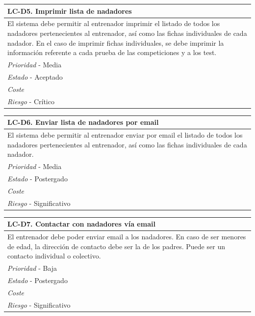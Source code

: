 	\begin{center}
		\begin{tabularx}{15cm}{|X|}
			\hline 
				\bf{LC-D5. Imprimir lista de nadadores}\\
			\hline
				El sistema debe permitir al entrenador imprimir el listado de todos los nadadores pertenecientes al entrenador, así como las fichas individuales de cada nadador. En el caso de imprimir fichas individuales, se debe imprimir la información referente a cada prueba de las competiciones y a los test.\\
			\hline
				{\it Prioridad} - Media\\
			\hline
				{\it Estado} - Aceptado\\
			\hline
				{\it Coste}\\
			\hline
				{\it Riesgo} - Crítico\\
			\hline
		\end{tabularx}
	\end{center}
	
	\begin{center}
		\begin{tabularx}{15cm}{|X|}
			\hline 
				\bf{LC-D6. Enviar lista de nadadores por email}\\
			\hline
				El sistema debe permitir al entrenador enviar por email el listado de todos los nadadores pertenecientes al entrenador, así como las fichas individuales de cada nadador.\\
			\hline
				{\it Prioridad} - Media\\
			\hline
				{\it Estado} - Postergado\\
			\hline
				{\it Coste}\\
			\hline
				{\it Riesgo} - Significativo\\
			\hline
		\end{tabularx}
	\end{center}
	
	\begin{center}
		\begin{tabularx}{15cm}{|X|}
			\hline 
				\bf{LC-D7. Contactar con nadadores vía email}\\
			\hline
				El entrenador debe poder enviar email a los nadadores. En caso de ser menores de edad, la dirección de contacto debe ser la de los padres. Puede ser un contacto individual o colectivo.\\
			\hline
				{\it Prioridad} - Baja\\
			\hline
				{\it Estado} - Postergado\\
			\hline
				{\it Coste}\\
			\hline
				{\it Riesgo} - Significativo\\
			\hline
		\end{tabularx}
	\end{center}
	
